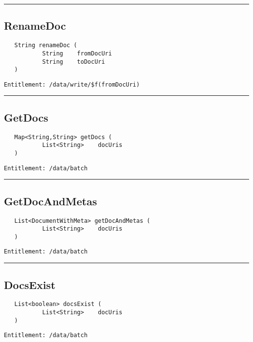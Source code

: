 \rule{12cm}{2pt}
\subsection{RenameDoc}
\label{Api:RenameDoc}
\begin{Verbatim}
   String renameDoc (
           String    fromDocUri
           String    toDocUri
   )
\end{Verbatim}
\begin{Verbatim}[formatcom=\color{Maroon}]
  Entitlement: /data/write/$f(fromDocUri)
\end{Verbatim}



\rule{12cm}{2pt}
\subsection{GetDocs}
\label{Api:GetDocs}
\begin{Verbatim}
   Map<String,String> getDocs (
           List<String>    docUris
   )
\end{Verbatim}
\begin{Verbatim}[formatcom=\color{Maroon}]
  Entitlement: /data/batch
\end{Verbatim}



\rule{12cm}{2pt}
\subsection{GetDocAndMetas}
\label{Api:GetDocAndMetas}
\begin{Verbatim}
   List<DocumentWithMeta> getDocAndMetas (
           List<String>    docUris
   )
\end{Verbatim}
\begin{Verbatim}[formatcom=\color{Maroon}]
  Entitlement: /data/batch
\end{Verbatim}



\rule{12cm}{2pt}
\subsection{DocsExist}
\label{Api:DocsExist}
\begin{Verbatim}
   List<boolean> docsExist (
           List<String>    docUris
   )
\end{Verbatim}
\begin{Verbatim}[formatcom=\color{Maroon}]
  Entitlement: /data/batch
\end{Verbatim}



